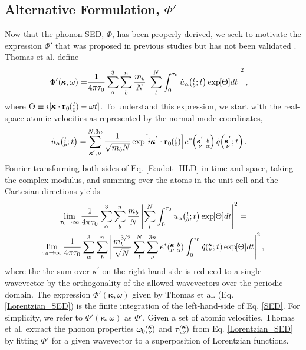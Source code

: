 \documentclass[12pt,twocolumn,iop]{/usr/share/texmf-texlive/tex/latex/iop/iopart}[/usr/share/texmf-texlive/tex/latex/iop/]
\newcommand{\EXP}[1]{\exp\mspace{-5.0mu}\left[#1\right]\mspace{-3.0mu}}
\newcommand{\SUMprime}[2]{\ifthenelse{\equal{#1}{0}}{\sum_{\alpha_{#2},b_{#2},l_{#2}}^{3,n,N}} {\ifthenelse{\equal{#1}{1}}{\sum_{\alpha_{#2},b_{#2}}^{3,n}}{\sum_{\pmb{\kappa}^{'}#2,\nu#2}^{N,3n}}}}
\newcommand{\ab}[2]{\mspace{-4.0mu}\left(\mspace{-8.0mu}\begin{smallmatrix}&\ifthenelse{\equal{#1}{}}{a}{#1} \\&\ifthenelse{\equal{#2}{}}{b}{#2}\end{smallmatrix}\mspace{-3.0mu}\right)}
\newcommand{\kvba}{\mspace{-4.0mu}\left(\mspace{-8.0mu}\begin{smallmatrix} &\pmb{\kappa} &b \\ &\nu &\alpha\end{smallmatrix}\mspace{-3.0mu}\right)}
\newcommand{\kpvba}{\mspace{-4.0mu}\left(\mspace{-8.0mu}\begin{smallmatrix} &\pmb{\kappa}^{'} &b \\ &\nu &\alpha\end{smallmatrix}\mspace{-3.0mu}\right)}
\newcommand{\kvt}{\mspace{-4.0mu}\left(\mspace{-8.0mu}\begin{smallmatrix}&\pmb{\kappa} \\&\nu\end{smallmatrix}\mspace{-2.0mu};t\right)}
\newcommand{\kpvt}{\mspace{-4.0mu}\left(\mspace{-8.0mu}\begin{smallmatrix}&\pmb{\kappa}^{'} \\&\nu\end{smallmatrix}\mspace{-2.0mu};t\right)}
\newcommand{\kv}{\mspace{-4.0mu}\left(\mspace{-8.0mu}\begin{smallmatrix}&\pmb{\kappa} \\&\nu\end{smallmatrix}\mspace{-3.0mu}\right)}
\newcommand{\lbt}{\mspace{-4.0mu}\left(\mspace{-8.0mu}\begin{smallmatrix}&l \\&b\end{smallmatrix}\mspace{-2.0mu};t\right)}
\begin{document}
\subsection{\label{S:Subsection_Proposed_SED}Alternative Formulation, $\Phi'$}

Now that the phonon SED, $\Phi$, has been properly derived, we seek to motivate the expression $\Phi'$ that was proposed in previous studies but has not been validated \cite{maruyama2003,shiomi2006,thomas2010c}. Thomas et al. \cite{thomas2010c} define
\begin{equation}\label{Lorentzian_SED}
\begin{split}
\Phi'(\pmb{\kappa},\omega) =& \frac{1}{4\pi\tau_0} \sum_\alpha^3 \sum_b^n \frac{m_b}{N}\left| \sum_l^N  \int_{0}^{\tau_0} \dot{u}_{\alpha}\lbt \EXP{\Theta} dt \right|^2,
\end{split}
\end{equation}
where $\Theta \equiv i[\pmb{\kappa}\cdot\mathbf{r}_0\ab{l}{0}-\omega t]$. To understand this expression, we start with the real-space atomic velocities as
represented by the normal mode coordinates,\cite{dove1993}
\begin{equation}\label{E:udot_HLD}
\begin{split}
\dot{u}_{\alpha}\lbt = &\SUMprime{2}{} \frac{1}{\sqrt{m_bN}} \EXP{i\pmb{\kappa}^{'}\cdot\mathbf{r}_0\ab{l}{0}} e^*\kpvba \dot{q}\kpvt{}{}{}.
\end{split}
\end{equation}
Fourier transforming both sides of Eq$.$ \eqref{E:udot_HLD} in time and space, taking the complex modulus, and summing over the atoms in the unit cell and the Cartesian directions yields
\begin{multline}\label{SED}
\lim_{\tau_0\rightarrow\infty}\frac{1}{4\pi\tau_0} \sum_\alpha^3 \sum_b^n \frac{m_b}{N} \left\lvert \sum_l^N  \int_{0}^{\tau_0} \dot{u}_{\alpha}\lbt \EXP{\Theta} dt \right\rvert^2 =
\\ \lim_{\tau_0\rightarrow\infty}\frac{1}{4\pi\tau_0} \sum_\alpha^3 \sum_b^n \left\lvert \frac{m_b^{3/2}}{\sqrt{N}} \sum_l^N \sum_{\nu}^{3n} e^*\kvba \int_{0}^{\tau_0}\dot{q}\kvt\EXP{\Theta}dt \right\rvert^2 ,
\end{multline}
where the the sum over $\pmb{\kappa}^{'}$ on the right-hand-side is reduced to a single wavevector by the orthogonality of the allowed wavevectors over the periodic domain. The expression $\Phi'(\pmb{\kappa},\omega)$ given by Thomas et al. \cite{thomas2010c} (Eq$.$ \eqref{Lorentzian_SED}) is the finite integration of the left-hand-side of Eq$.$ \eqref{SED}. For simplicity, we refer to $\Phi'(\pmb{\kappa},\omega)$ as $\Phi'$. Given a set of atomic velocities, Thomas et al. extract the phonon properties $\omega_0\kv$ and $\tau\kv$ from Eq$.$ \eqref{Lorentzian_SED} by fitting $\Phi'$ for a given wavevector to a superposition of Lorentzian functions.
\end{document}
